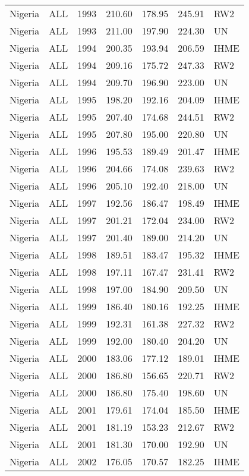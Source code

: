 \begin{longtable}{lllrrrl}
  Nigeria & ALL & 1993 & 210.60 & 178.95 & 245.91 & RW2 \\ 
  Nigeria & ALL & 1993 & 211.00 & 197.90 & 224.30 & UN \\ 
  Nigeria & ALL & 1994 & 200.35 & 193.94 & 206.59 & IHME \\ 
  Nigeria & ALL & 1994 & 209.16 & 175.72 & 247.33 & RW2 \\ 
  Nigeria & ALL & 1994 & 209.70 & 196.90 & 223.00 & UN \\ 
  Nigeria & ALL & 1995 & 198.20 & 192.16 & 204.09 & IHME \\ 
  Nigeria & ALL & 1995 & 207.40 & 174.68 & 244.51 & RW2 \\ 
  Nigeria & ALL & 1995 & 207.80 & 195.00 & 220.80 & UN \\ 
  Nigeria & ALL & 1996 & 195.53 & 189.49 & 201.47 & IHME \\ 
  Nigeria & ALL & 1996 & 204.66 & 174.08 & 239.63 & RW2 \\ 
  Nigeria & ALL & 1996 & 205.10 & 192.40 & 218.00 & UN \\ 
  Nigeria & ALL & 1997 & 192.56 & 186.47 & 198.49 & IHME \\ 
  Nigeria & ALL & 1997 & 201.21 & 172.04 & 234.00 & RW2 \\ 
  Nigeria & ALL & 1997 & 201.40 & 189.00 & 214.20 & UN \\ 
  Nigeria & ALL & 1998 & 189.51 & 183.47 & 195.32 & IHME \\ 
  Nigeria & ALL & 1998 & 197.11 & 167.47 & 231.41 & RW2 \\ 
  Nigeria & ALL & 1998 & 197.00 & 184.90 & 209.50 & UN \\ 
  Nigeria & ALL & 1999 & 186.40 & 180.16 & 192.25 & IHME \\ 
  Nigeria & ALL & 1999 & 192.31 & 161.38 & 227.32 & RW2 \\ 
  Nigeria & ALL & 1999 & 192.00 & 180.40 & 204.20 & UN \\ 
  Nigeria & ALL & 2000 & 183.06 & 177.12 & 189.01 & IHME \\ 
  Nigeria & ALL & 2000 & 186.80 & 156.65 & 220.71 & RW2 \\ 
  Nigeria & ALL & 2000 & 186.80 & 175.40 & 198.60 & UN \\ 
  Nigeria & ALL & 2001 & 179.61 & 174.04 & 185.50 & IHME \\ 
  Nigeria & ALL & 2001 & 181.19 & 153.23 & 212.67 & RW2 \\ 
  Nigeria & ALL & 2001 & 181.30 & 170.00 & 192.90 & UN \\ 
  Nigeria & ALL & 2002 & 176.05 & 170.57 & 182.25 & IHME \\ 

\end{longtable}
